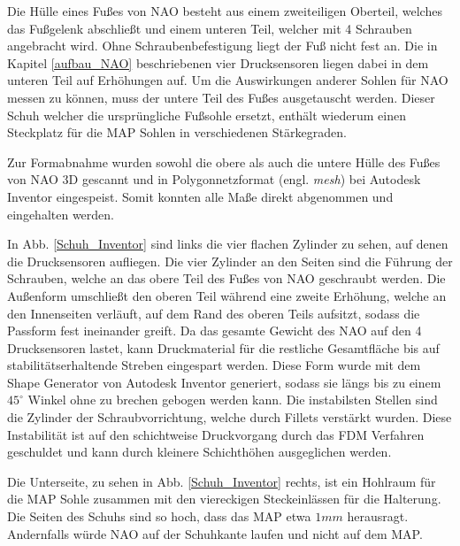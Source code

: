 Die Hülle eines Fußes von NAO besteht aus einem zweiteiligen Oberteil, welches das Fußgelenk abschließt und einem unteren Teil, welcher mit 4 Schrauben angebracht wird. Ohne Schraubenbefestigung liegt der Fuß nicht fest an. Die in Kapitel \ref{aufbau_NAO} beschriebenen vier Drucksensoren liegen dabei in dem unteren Teil auf Erhöhungen auf. Um die Auswirkungen anderer Sohlen für NAO messen zu können, muss der untere Teil des Fußes ausgetauscht werden. Dieser \glqq Schuh\grqq{} welcher die ursprüngliche Fußsohle ersetzt, enthält wiederum einen Steckplatz für die MAP Sohlen in verschiedenen Stärkegraden. 

Zur Formabnahme wurden sowohl die obere als auch die untere Hülle des Fußes von NAO 3D gescannt und in Polygonnetzformat (engl. \textit{mesh}) bei Autodesk Inventor eingespeist. Somit konnten alle Maße direkt abgenommen und eingehalten werden. 

In Abb. \ref{Schuh_Inventor} sind links die vier flachen Zylinder zu sehen, auf denen die Drucksensoren aufliegen. Die vier Zylinder an den Seiten sind die Führung der Schrauben, welche an das obere Teil des Fußes von NAO geschraubt werden. Die Außenform umschließt den oberen Teil während eine zweite Erhöhung, welche an den Innenseiten verläuft, auf dem Rand des oberen Teils aufsitzt, sodass die Passform fest ineinander greift. Da das gesamte Gewicht des NAO auf den 4 Drucksensoren lastet, kann Druckmaterial für die restliche Gesamtfläche bis auf stabilitätserhaltende Streben eingespart werden. Diese Form wurde mit dem Shape Generator von Autodesk Inventor generiert, sodass sie längs bis zu einem $45^\circ$ Winkel ohne zu brechen gebogen werden kann. Die instabilsten Stellen sind die Zylinder der Schraubvorrichtung, welche durch Fillets verstärkt wurden. Diese Instabilität ist auf den schichtweise Druckvorgang durch das FDM Verfahren geschuldet und kann durch kleinere Schichthöhen ausgeglichen werden.

Die Unterseite, zu sehen in Abb. \ref{Schuh_Inventor} rechts, ist ein Hohlraum für die MAP Sohle zusammen mit den viereckigen Steckeinlässen für die Halterung. Die Seiten des Schuhs sind so hoch, dass das MAP etwa $1 \unit{mm}$ herausragt. Andernfalls würde NAO auf der Schuhkante laufen und nicht auf dem MAP.  

